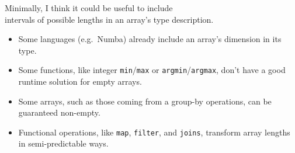 \documentclass[aspectratio=169]{beamer}
\begin{document}
\begin{frame}{}
\Large
\vspace{1.25 cm}
\begin{center}
Minimally, I think it could be useful to include \\ intervals of possible lengths in an array's type description.

\large
\vspace{0.5 cm}
\begin{minipage}{0.85\linewidth}
\begin{itemize}
\item Some languages (e.g.\ Numba) already include an array's dimension in its type.
\item Some functions, like integer {\tt min}/{\tt max} or {\tt argmin}/{\tt argmax}, don't have a good runtime solution for empty arrays.
\item Some arrays, such as those coming from a group-by operations, can be guaranteed non-empty.
\item Functional operations, like {\tt map}, {\tt filter}, and {\tt joins}, transform array lengths in semi-predictable ways.
\end{itemize}
\end{minipage}
\end{center}
\end{frame}
\end{document}
